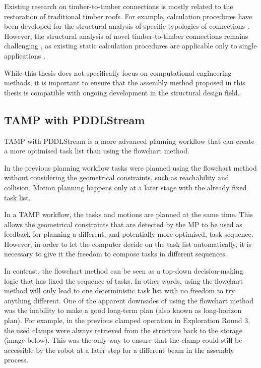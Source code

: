 Existing research on timber-to-timber connections is mostly related to the restoration of traditional timber roofs. For example, calculation procedures have been developed for the structural analysis of specific typologies of connections \parencite{holzerstefanm.StaticAssessmentHistorical2015}. However, the structural analysis of novel timber-to-timber connections remains challenging \parencite{tanadiniAnalysisDesignTimbertotimber2021}, as existing static calculation procedures are applicable only to single applications \parencite{fangJoineryConnectionsTimber2018, nguyenDevelopmentSpringModel2018, rezaeiradMacroscopicModelSpatial2020}. 

While this thesis does not specifically focus on computational engineering methods, it is important to ensure that the assembly method proposed in this thesis is compatible with ongoing development in the structural design field.

\subsection{TAMP with PDDLStream}
\label{subsection:exploration-5-tamp-with-pddlstream}

TAMP with PDDLStream \parencite{garrettPDDLStreamIntegratingSymbolic2020}is a more advanced planning workflow that can create a more optimised task list than using the flowchart method.

In the previous planning workflow  tasks were planned using the flowchart method  without considering the geometrical constraints, such as reachability and collision. Motion planning happens only at a later stage with the already fixed task list. 

In a TAMP workflow, the tasks and motions are planned at the same time. This allows the geometrical constraints that are detected by the MP to be used as feedback for planning a different, and potentially more optimised, task sequence. However, in order to let the computer decide on the task list automatically, it is necessary to give it the freedom to compose tasks in different sequences. 

In contrast, the flowchart method can be seen as a top-down decision-making logic that has fixed the sequence of tasks. In other words, using the flowchart method will only lead to one deterministic task list with no freedom to try anything different. One of the apparent downsides of using the flowchart method was the inability to make a good long-term plan (also known as long-horizon plan). For example, in the previous clamped operation in Exploration Round 3, the used clamps were always retrieved from the structure back to the storage (image below). This was the only way to ensure that the clamp could still be accessible by the robot at a later step for a different beam in the assembly process. 

